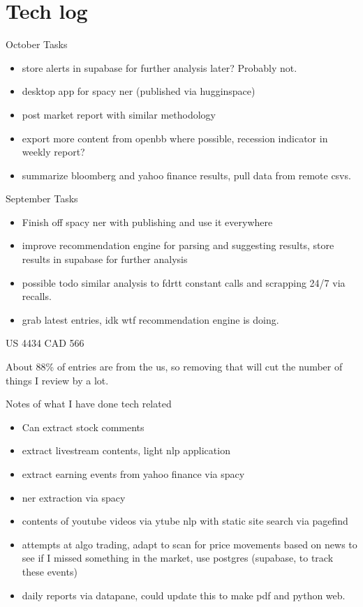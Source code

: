 \section{Tech log}

October Tasks

\begin{itemize}
        \item store alerts in supabase for further analysis later? Probably not.
        \item desktop app for spacy ner (published via hugginspace)
        \item post market report with similar methodology
        \item export more content from openbb where possible, recession indicator in weekly report?
        \item summarize bloomberg and yahoo finance results, pull data from remote csvs.
\end{itemize}

September Tasks

\begin{itemize}
    \item Finish off spacy ner with publishing and use it everywhere
    \item improve recommendation engine for parsing and suggesting results, store results in supabase for further analysis
    \item possible todo similar analysis to fdrtt constant calls and scrapping 24/7 via recalls.
    \item grab latest entries, idk wtf recommendation engine is doing. 
\end{itemize}

US 4434
CAD 566

About 88\% of entries are from the us, so removing that will cut the number of things I review by a lot.

Notes of what I have done tech related

\begin{itemize}
    \item Can extract stock comments
    \item extract livestream contents, light nlp application
    \item extract earning events from yahoo finance via spacy
    \item ner extraction via spacy
    \item contents of youtube videos via ytube nlp with static site search via pagefind
    \item attempts at algo trading, adapt to scan for price movements based on news to see if I missed something in the market, use postgres (supabase, to track these events)
    \item daily reports via datapane, could update this to make pdf and python web.
\end{itemize}